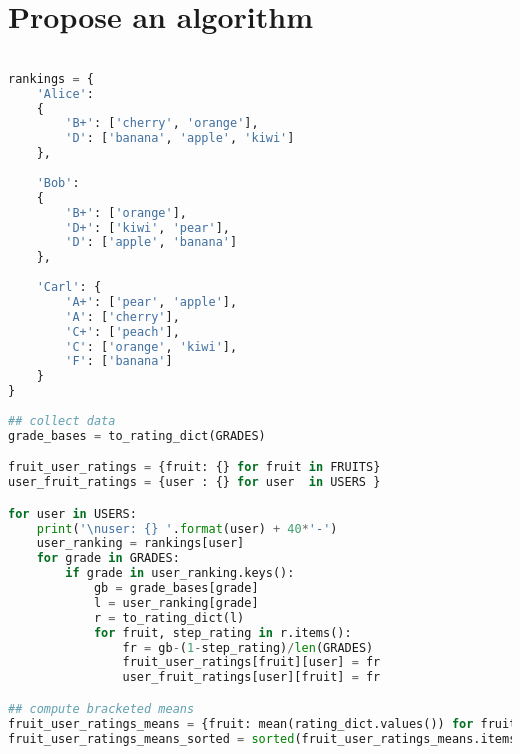 
\section{Propose an algorithm}

{\color{red}{
TODO: explain the below in detail and put it in context
}}

\begin{lstlisting}[language=Python]

rankings = {
    'Alice': 
    {
        'B+': ['cherry', 'orange'], 
        'D': ['banana', 'apple', 'kiwi']
    },
    
    'Bob': 
    {
        'B+': ['orange'], 
        'D+': ['kiwi', 'pear'], 
        'D': ['apple', 'banana']
    },
    
    'Carl': {
        'A+': ['pear', 'apple'], 
        'A': ['cherry'], 
        'C+': ['peach'], 
        'C': ['orange', 'kiwi'], 
        'F': ['banana']
    }
}
    
## collect data
grade_bases = to_rating_dict(GRADES)

fruit_user_ratings = {fruit: {} for fruit in FRUITS}
user_fruit_ratings = {user : {} for user  in USERS }

for user in USERS:
    print('\nuser: {} '.format(user) + 40*'-')
    user_ranking = rankings[user]
    for grade in GRADES:
        if grade in user_ranking.keys():
            gb = grade_bases[grade]
            l = user_ranking[grade]
            r = to_rating_dict(l)
            for fruit, step_rating in r.items():
                fr = gb-(1-step_rating)/len(GRADES)
                fruit_user_ratings[fruit][user] = fr
                user_fruit_ratings[user][fruit] = fr

## compute bracketed means
fruit_user_ratings_means = {fruit: mean(rating_dict.values()) for fruit, rating_dict in fruit_user_ratings.items()}
fruit_user_ratings_means_sorted = sorted(fruit_user_ratings_means.items(), key=operator.itemgetter(1))

\end{lstlisting}

{\color{red}{
TODO: make the above code prettier
}}
